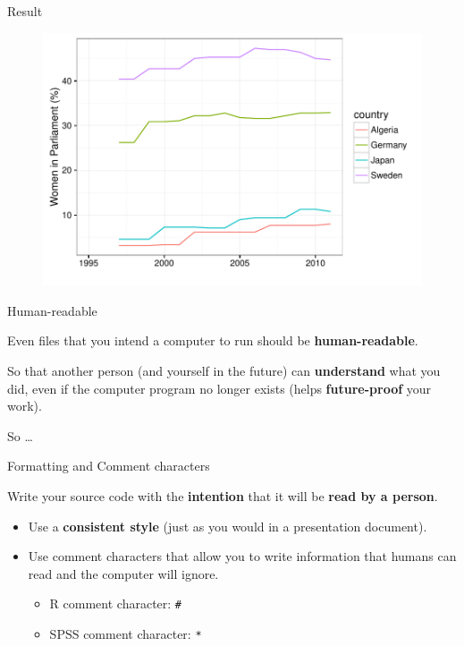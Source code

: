 \documentclass[10pt]{beamer}
\begin{document}
\begin{frame}{Result}

    \begin{figure}
        \includegraphics[scale=0.5]{img/women_compare.pdf}
    \end{figure}

\end{frame}

\begin{frame}{Human-readable}

    Even files that you intend a computer to run should be \textbf{human-readable}.

    \vspace{1.5cm}

    So that another person (and yourself in the future) can \textbf{understand} what you did, even if the computer program no longer exists (helps \textbf{future-proof} your work).

    \vspace{0.5cm}

    So \ldots

\end{frame}

\begin{frame}{Formatting and Comment characters}

    Write your source code with the \textbf{intention} that it will be \textbf{read by a person}.

    \begin{itemize}
        \item Use a \textbf{consistent style} (just as you would in a presentation document).

        \item Use \alert{comment characters} that allow you to write information that humans can read and the computer will ignore.

            \begin{itemize}
                \item R comment character: \texttt{\#}
                \item SPSS comment character: \texttt{*}
            \end{itemize}
    \end{itemize}


\end{frame}
\end{document}
